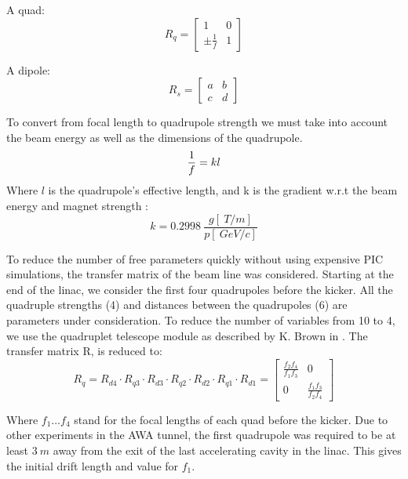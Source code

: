 A quad: 
\begin{equation}
R_q = 
\begin{bmatrix}
1 & 0 \\
\pm \frac{1}{f} & 1
\end{bmatrix}
\end{equation}

A dipole:
\begin{equation}
R_s = 
\begin{bmatrix}
a & b \\
c & d
\end{bmatrix}
\end{equation}

To convert from focal length to quadrupole strength we must take into account the 
beam energy as well as the dimensions of the quadrupole. 
\begin{equation}
	\frac{1}{f} = kl \\
\end{equation}
Where $l$ is the quadrupole's effective length, and k is the gradient w.r.t 
the beam energy and magnet strength \cite{Wiedemann}:
\begin{equation}
	k = \SI{0.2998}{} \frac{g[\SI{}{T/m}]}{p [\SI{}{GeV/c}]}\label{k}
\end{equation}



 To reduce the number of free parameters quickly without using expensive PIC simulations, 
 the transfer matrix of the beam line was considered. Starting at the end of the linac, 
 we consider the first four quadrupoles before the kicker. All the quadruple strengths (4) and
 distances between the quadrupoles (6) are parameters under consideration. To reduce the number
 of variables from 10 to 4, we use the quadruplet telescope module as described by K. Brown in \cite{brown}.  The transfer matrix R, is reduced to:  
 \begin{equation}
 R_q = R_{d4} \cdot R_{q3} \cdot R_{d3} \cdot R_{q2} \cdot R_{d2} \cdot R_{q1} \cdot R_{d1} = 
 \begin{bmatrix}
 \frac{f_2 f_4}{f_1 f_3} & 0 \\
 0 & \frac{f_1 f_3}{f_2 f_4}	
 \end{bmatrix}\label{kb1}
 \end{equation}

Where $f_1 \ldots f_4$ stand for the focal lengths of each quad before the kicker. 
Due to other experiments in the AWA tunnel, 
the first quadrupole was required to be at least $\SI{3}{m}$ away from the exit of the 
last accelerating cavity in the linac. This gives the initial drift length and value
for $f_1$. 

